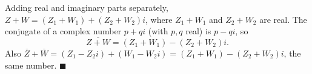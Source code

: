 Adding real and imaginary parts separately, $Z+W=(Z_1+W_1)+(Z_2+W_2)i$, where $Z_1+W_1$ and $Z_2+W_2$ are real. The conjugate of a complex number $p+qi$ (with $p,q$ real) is $p-qi$, so
\[
\overline{Z+W}=(Z_1+W_1)-(Z_2+W_2)i .
\]
Also $\overline Z+\overline W=(Z_1-Z_2i)+(W_1-W_2i)=(Z_1+W_1)-(Z_2+W_2)i$, the same number. $\blacksquare$
